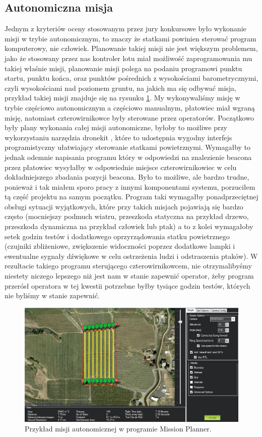 \subsection{Autonomiczna misja}
Jednym z kryteriów oceny stosowanym przez jury konkursowe było wykonanie misji w trybie autonomicznym, to znaczy że statkami powinien sterować program komputerowy, nie człowiek. Planowanie takiej misji nie jest większym problemem, jako że stosowany przez nas kontroler lotu miał możliwość zaprogramowania mu takiej właśnie misji, planowanie misji polega na podaniu programowi punktu startu, punktu końca, oraz punktów pośrednich z wysokościami barometrycznymi, czyli wysokościami nad poziomem gruntu, na jakich ma się odbywać misja, przykład takiej misji znajduje się na rysunku \ref{fig:misja}. My wykonywaliśmy misję w trybie częściowo autonomicznym a częściowo manualnym, płatowiec miał wgraną misję, natomiast czterowirnikowce były sterowane przez operatorów. Początkowo były plany wykonania całej misji autonomiczne, byłoby to możliwe przy wykorzystaniu narzędzia dronekit \cite{dronekit}, które to udostępnia wygodny interfejs programistyczny ułatwiający sterowanie statkami powietrznymi. Wymagałby to jednak odemnie napisania programu który w odpowiedzi na znalezienie beacona przez płatowiec wysyłałby w odpowiednie miejsce czterowirnikowiec w celu dokładniejszego zbadania pozycji beacona. Było to możliwe, ale bardzo trudne, ponieważ i tak miałem sporo pracy z innymi komponentami systemu, porzuciłem tą część projektu na samym początku. Program taki wymagałby ponadprzeciętnej obsługi sytuacji wyjątkowych, które przy takich misjach pojawiają się bardzo często (mocniejszy podmuch wiatru, przeszkoda statyczna na przykład drzewo, przeszkoda dynamiczna na przykład człowiek lub ptak) a to z kolei wymagałoby setek godzin testów i dodatkowego oprzyrządowania statku powietrznego (czujniki zbliżeniowe, zwiększenie widoczności poprzez dodatkowe lampki i ewentualne sygnały dźwiękowe w celu ostrzeżenia ludzi i odstraszenia ptaków). W rezultacie takiego programu sterującego czterowirnikowcem, nie otrzymalibyśmy niestety niczego lepszego niż jest nam w stanie zapewnić operator, żeby program przerósł operatora w tej kwestii potrzebne byłby tysiące godzin testów, których nie byliśmy w stanie zapewnić.

\begin{figure}[!th]
    \centering
    \includegraphics[width=15cm]{zalaczniki/obrazy/misja.jpg}
    \caption{Przykład misji autonomicznej w programie Mission Planner.}
    \label{fig:misja}
\end{figure}

